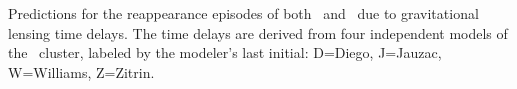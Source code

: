\label{fig:SpockDelayPredictions}
Predictions for the reappearance episodes of both \spockone\ and \spocktwo\, due to gravitational lensing time delays.  The time delays are derived from four independent models of the \ cluster, labeled by the modeler's last initial: D=Diego, J=Jauzac, W=Williams, Z=Zitrin. 
  
  